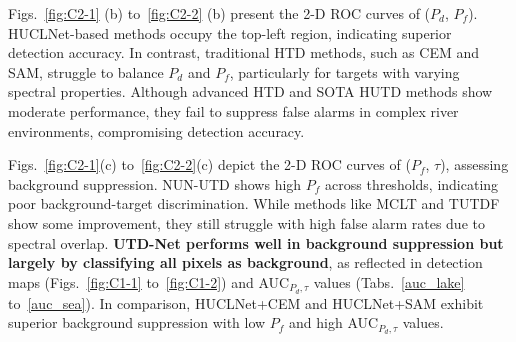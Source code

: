 Figs.~\ref{fig:C2-1} (b) to~\ref{fig:C2-2} (b) present the 2-D ROC curves of ($P_d$, $P_f$). HUCLNet-based methods occupy the top-left region, indicating superior detection accuracy. In contrast, traditional HTD methods, such as CEM and SAM, struggle to balance $P_d$ and $P_f$, particularly for targets with varying spectral properties. Although advanced HTD and SOTA HUTD methods show moderate performance, they fail to suppress false alarms in complex river environments, compromising detection accuracy.

Figs.~\ref{fig:C2-1}(c) to~\ref{fig:C2-2}(c) depict the 2-D ROC curves of ($P_f$, $\tau$), assessing background suppression. NUN-UTD shows high $P_f$ across thresholds, indicating poor background-target discrimination. While methods like MCLT and TUTDF show some improvement, they still struggle with high false alarm rates due to spectral overlap. \textbf{UTD-Net performs well in background suppression but largely by classifying all pixels as background}, as reflected in detection maps (Figs.~\ref{fig:C1-1} to~\ref{fig:C1-2}) and AUC$_{P_{d}, \tau}$ values (Tabs.~\ref{auc_lake} to~\ref{auc_sea}). In comparison, HUCLNet+CEM and HUCLNet+SAM exhibit superior background suppression with low $P_f$ and high AUC$_{P_{d}, \tau}$ values.

